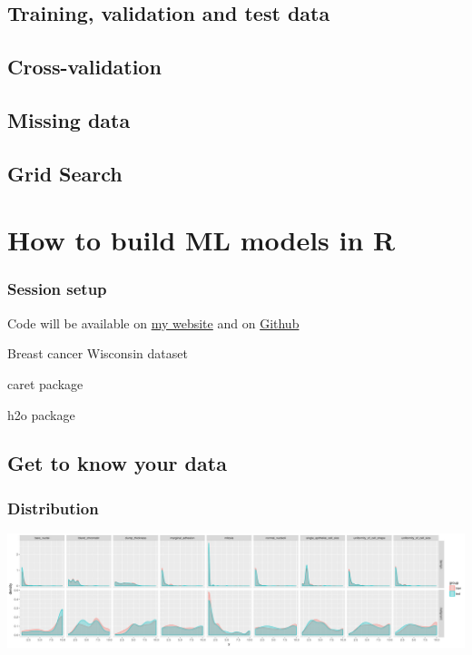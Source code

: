 \documentclass[handout, t, 11pt, xcolor=svgnames, hyperref={colorlinks,citecolor=DeepPink4,linkcolor=DarkRed,urlcolor=DarkBlue}]{beamer} %
\begin{document}

\subsection{Training, validation and test data}

\subsection{Cross-validation}

\subsection{Missing data}

\subsection{Grid Search}




\section{How to build ML models in R}

\begin{frame}
	\frametitle{Session setup}
	
	Code will be available on \href{https://shiring.github.io}{my website} and on \href{https://github.com/ShirinG/Webinar_ML_for_disease}{Github}
	
	Breast cancer Wisconsin dataset
	
	caret package
	
	h2o package
\end{frame}

\subsection{Get to know your data}

\begin{frame}
	\frametitle{Distribution}
	
	\begin{center}\includegraphics[width=1\textwidth]{webinar_code_files/figure-latex/unnamed-chunk-6-1} \end{center}
\end{frame}
\end{document}
